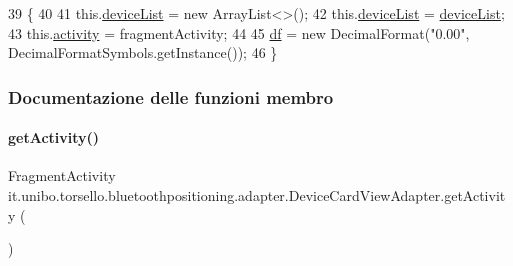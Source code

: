 \begin{DoxyCode}
39                                                                                                    \{
40 
41         this.\hyperlink{classit_1_1unibo_1_1torsello_1_1bluetoothpositioning_1_1adapter_1_1DeviceCardViewAdapter_a72413f87c723c585bd1ad9bc5711cf39_a72413f87c723c585bd1ad9bc5711cf39}{deviceList} = \textcolor{keyword}{new} ArrayList<>();
42         this.\hyperlink{classit_1_1unibo_1_1torsello_1_1bluetoothpositioning_1_1adapter_1_1DeviceCardViewAdapter_a72413f87c723c585bd1ad9bc5711cf39_a72413f87c723c585bd1ad9bc5711cf39}{deviceList} = \hyperlink{classit_1_1unibo_1_1torsello_1_1bluetoothpositioning_1_1adapter_1_1DeviceCardViewAdapter_a72413f87c723c585bd1ad9bc5711cf39_a72413f87c723c585bd1ad9bc5711cf39}{deviceList};
43         this.\hyperlink{classit_1_1unibo_1_1torsello_1_1bluetoothpositioning_1_1adapter_1_1DeviceCardViewAdapter_ad9b0572ad094da8225f1c2024ac2eb61_ad9b0572ad094da8225f1c2024ac2eb61}{activity} = fragmentActivity;
44 
45         \hyperlink{classit_1_1unibo_1_1torsello_1_1bluetoothpositioning_1_1adapter_1_1DeviceCardViewAdapter_ae3a2fe6b4e69e1f9b8edfb9bcba14057_ae3a2fe6b4e69e1f9b8edfb9bcba14057}{df} = \textcolor{keyword}{new} DecimalFormat(\textcolor{stringliteral}{"0.00"}, DecimalFormatSymbols.getInstance());
46     \}
\end{DoxyCode}


\subsubsection{Documentazione delle funzioni membro}
\hypertarget{classit_1_1unibo_1_1torsello_1_1bluetoothpositioning_1_1adapter_1_1DeviceCardViewAdapter_a0ff32c6bf5d84b68021bf586d64cacaf_a0ff32c6bf5d84b68021bf586d64cacaf}{}\label{classit_1_1unibo_1_1torsello_1_1bluetoothpositioning_1_1adapter_1_1DeviceCardViewAdapter_a0ff32c6bf5d84b68021bf586d64cacaf_a0ff32c6bf5d84b68021bf586d64cacaf} 
\paragraph{\texorpdfstring{get\+Activity()}{getActivity()}}
{\footnotesize\ttfamily Fragment\+Activity it.\+unibo.\+torsello.\+bluetoothpositioning.\+adapter.\+Device\+Card\+View\+Adapter.\+get\+Activity (\begin{DoxyParamCaption}{ }\end{DoxyParamCaption})\hspace{0.3cm}{\ttfamily [private]}}


